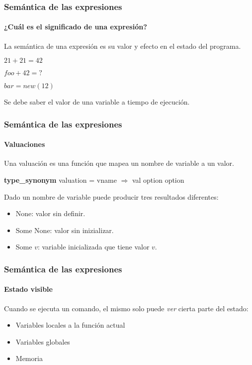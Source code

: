 \begin{frame}
\frametitle{Semántica de las expresiones}
\framesubtitle{¿Cuál es el significado de una expresión?}

La semántica de una expresión es su valor y efecto en el estado del programa.

\pause
\begin{example}
$21 + 21 = 42$

\pause

$foo + 42 = ?$

\pause

$bar = new (12)$
\end{example}
\pause

Se debe saber el valor de una variable a tiempo de ejecución.



\end{frame}


\begin{frame}[fragile]
\frametitle{Semántica de las expresiones}
\framesubtitle{Valuaciones}

Una valuación es una función que mapea un nombre de variable a un valor.

\bigskip
\pause

\textbf{type\_synonym} valuation = vname $\Rightarrow$ val option option

\bigskip

\pause
Dado un nombre de variable puede producir tres resultados diferentes:

\bigskip

\pause
\begin{itemize}
\item{None: valor sin definir.}
\pause
\item{Some None: valor sin inizializar.}
\pause
\item{Some $v$: variable inicializada que tiene valor $v$.}
\end{itemize}


\end{frame}


\begin{frame}
\frametitle{Semántica de las expresiones}
\framesubtitle{Estado visible}

Cuando se ejecuta un comando, el mismo solo puede \textit{ver} cierta parte del estado:

\bigskip
\pause
\begin{itemize}
\item{Variables locales a la función actual}
\pause
\item{Variables globales}
\pause
\item{Memoria}
\end{itemize}


\end{frame}


